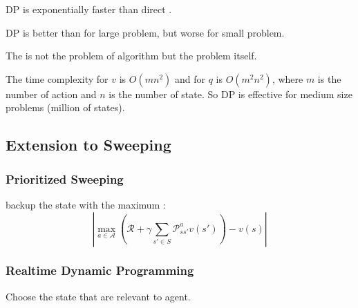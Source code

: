 DP is exponentially faster than direct .

DP is better than  for large problem, but worse for small problem.


The  is not the problem of algorithm but the problem itself.

The time complexity for $v$ is $O(mn^2)$ and for $q$ is $O(m^2 n^2)$, where $m$ is the number of action and $n$ is the number of state. So DP is effective for medium size problems (million of states).

\subsection{Extension to Sweeping}

\subsubsection{Prioritized Sweeping}

backup the state with the maximum :
\begin{equation}
	\left| \max_{ a \in \mathcal{A}} \left( \mathcal{R}
	+ \gamma \sum_{s' \in S} \mathcal{P}_{ss'}^a v(s') \right) - v(s) \right|
\end{equation}

\subsubsection{Realtime Dynamic Programming}

Choose the state that are relevant to agent.

